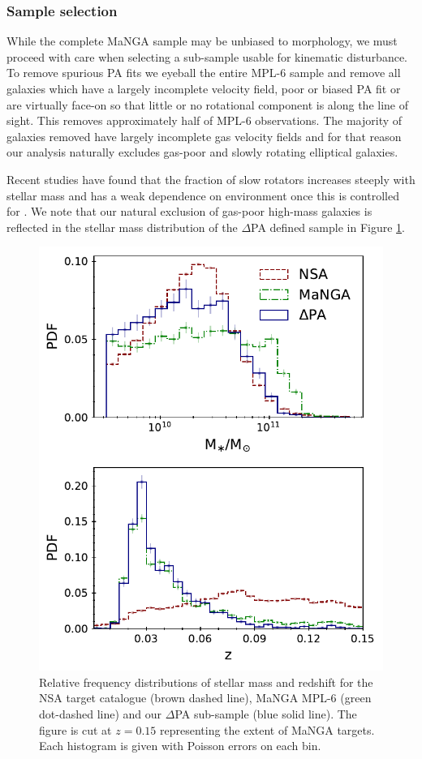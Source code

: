 \subsubsection{Sample selection} \label{sec:samp_sec}
While the complete MaNGA sample may be unbiased to morphology, we must proceed with care when selecting a sub-sample usable for kinematic disturbance. To remove spurious PA fits we eyeball the entire MPL-6 sample and remove all galaxies which have a largely incomplete velocity field, poor or biased PA fit or are virtually face-on so that little or no rotational component is along the line of sight. This removes approximately half of MPL-6 observations. The majority of galaxies removed have largely incomplete gas velocity fields and for that reason our analysis naturally excludes gas-poor and slowly rotating elliptical galaxies. 

Recent studies have found that the fraction of slow rotators increases steeply with stellar mass and has a weak dependence on environment once this is controlled for \citep[e.g.][]{greene2018,lagos2018}. We note that our natural exclusion of gas-poor high-mass galaxies is reflected in the stellar mass distribution of the $\Delta$PA defined sample in Figure \ref{fig:samp_cons}. 

\begin{figure}
    \centering
	\includegraphics[width=0.6\linewidth]{thesis/latex/halo_assembly_manga/sample_consistency.pdf}
    \caption[Relative frequency distributions of stellar mass and redshift for the NSA target catalogue, MaNGA MPL-6 and $\Delta$PA sub-samples.]{Relative frequency distributions of stellar mass and redshift for the NSA target catalogue (brown dashed line), MaNGA MPL-6 (green dot-dashed line) and our $\Delta$PA sub-sample (blue solid line). The figure is cut at $z=0.15$ representing the extent of MaNGA targets. Each histogram is given with Poisson errors on each bin.}
    \label{fig:samp_cons}
\end{figure}

